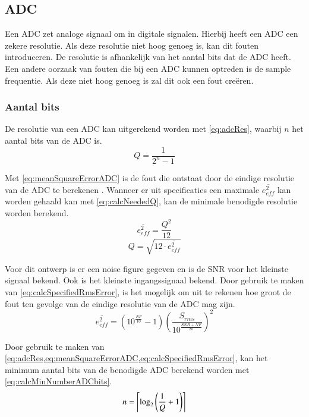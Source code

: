 \subsection{ADC}

Een ADC zet analoge signaal om in digitale signalen. Hierbij heeft een ADC een zekere resolutie. Als deze resolutie niet hoog genoeg is, kan dit fouten introduceren. De resolutie is afhankelijk van het aantal bits dat de ADC heeft. Een andere oorzaak van fouten die bij een ADC kunnen optreden is de sample frequentie. Als deze niet hoog genoeg is zal dit ook een fout creëren.

\subsubsection{Aantal bits} \label{sec:ADC:numBits}
De resolutie van een ADC kan uitgerekend worden met \cref{eq:adcRes}, waarbij $n$ het aantal bits van de ADC is.
\begin{equation}\label{eq:adcRes}
    Q=\frac{1}{2^n-1}
\end{equation}

Met \cref{eq:meanSquareErrorADC} is de fout die ontstaat door de eindige resolutie van de ADC te berekenen \cite{MJHcalcADC}. Wanneer er uit specificaties een maximale $\overline{e_{eff}^2}$ kan worden gehaald kan met \cref{eq:calcNeededQ}, kan de minimale benodigde resolutie worden berekend.
\begin{equation}\label{eq:meanSquareErrorADC} 
    \overline{e_{eff}^2}=\frac{Q^2}{12}
\end{equation}
\begin{equation}\label{eq:calcNeededQ}
    Q=\sqrt{12\cdot\overline{e_{eff}^2}}
\end{equation}

Voor dit ontwerp is er een noise figure gegeven en is de SNR voor het kleinste signaal bekend. Ook is het kleinste ingangssignaal bekend. Door gebruik te maken van \cref{eq:calcSpecifiedRmsError}, is het mogelijk om uit te rekenen hoe groot de fout ten gevolge van de eindige resolutie van de ADC mag zijn.
\begin{equation}\label{eq:calcSpecifiedRmsError}
    \overline{e_{eff}^2}=\left(10^{\frac{NF}{10}}-1\right)\left(\frac{S_{rms}}{10^{\frac{SNR+NF}{20}}}\right)^2
\end{equation}

Door gebruik te maken van \cref{eq:adcRes,eq:meanSquareErrorADC,eq:calcSpecifiedRmsError}, kan het minimum aantal bits van de benodigde ADC berekend worden met \cref{eq:calcMinNumberADCbits}.
\begin{equation}\label{eq:calcMinNumberADCbits}
    n=\left\lceil\log_2\left(\frac{1}{Q}+1\right)\right\rceil
    \tagaddtext{[bits]}
\end{equation}

